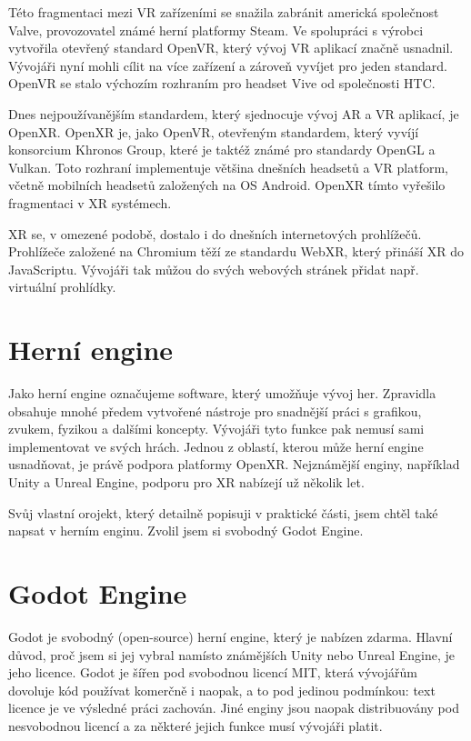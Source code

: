 Této fragmentaci mezi VR zařízeními se snažila zabránit americká společnost Valve, provozovatel známé herní platformy Steam. Ve spolupráci s výrobci vytvořila otevřený standard OpenVR, který vývoj VR aplikací značně usnadnil. Vývojáři nyní mohli cílit na více zařízení a zároveň vyvíjet pro jeden standard. OpenVR se stalo výchozím rozhraním pro headset Vive od společnosti HTC. \cite{enwiki:1192992480}

Dnes nejpoužívanějším standardem, který sjednocuje vývoj AR a VR aplikací, je OpenXR. OpenXR je, jako OpenVR, otevřeným standardem, který vyvíjí konsorcium Khronos Group, které je taktéž známé pro standardy OpenGL a Vulkan. Toto rozhraní implementuje většina dnešních headsetů a VR platform, včetně mobilních headsetů založených na OS Android. OpenXR tímto vyřešilo fragmentaci v XR systémech. \cite{enwiki:1186405367}

XR se, v omezené podobě, dostalo i do dnešních internetových prohlížečů. Prohlížeče založené na Chromium těží ze standardu WebXR, který přináší XR do JavaScriptu. Vývojáři tak můžou do svých webových stránek přidat např. virtuální prohlídky. \cite{webxr_mdn}

\section{Herní engine}

Jako herní engine označujeme software, který umožňuje vývoj her. Zpravidla obsahuje mnohé předem vytvořené nástroje pro snadnější práci s grafikou, zvukem, fyzikou a dalšími koncepty. Vývojáři tyto funkce pak nemusí sami implementovat ve svých hrách. Jednou z oblastí, kterou může herní engine usnadňovat, je právě podpora platformy OpenXR. Nejznámější enginy, například Unity a Unreal Engine, podporu pro XR nabízejí už několik let. \cite{enwiki:1186405367}

Svůj vlastní orojekt, který detailně popisuji v praktické části, jsem chtěl také napsat v herním enginu. Zvolil jsem si svobodný Godot Engine.

\section{Godot Engine}

Godot je svobodný (open-source) herní engine, který je nabízen zdarma. Hlavní důvod, proč jsem si jej vybral namísto známějších Unity nebo Unreal Engine, je jeho licence. Godot je šířen pod svobodnou licencí MIT, která vývojářům dovoluje kód používat komerčně i naopak, a to pod jedinou podmínkou: text licence je ve výsledné práci zachován. Jiné enginy jsou naopak distribuovány pod nesvobodnou licencí a za některé jejich funkce musí vývojáři platit.

